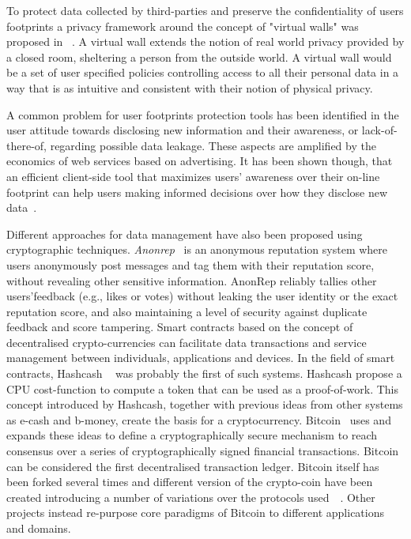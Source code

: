 To protect data collected by third-parties and preserve the confidentiality of users footprints a privacy framework around the concept of "virtual walls" was proposed in ~\cite{kapadia2007virtual}. A virtual wall extends the notion of real world privacy provided by a closed room, sheltering a person from the outside world. A virtual wall would be a set of user specified policies controlling access to all their personal data
in a way that is as intuitive and consistent with their notion of physical privacy.

A common problem for user footprints protection tools has been identified in the user attitude towards disclosing new information and their awareness, or lack-of-there-of, regarding possible data leakage. These aspects are amplified by the economics of web services based on advertising. It has been shown though, that an efficient client-side tool that maximizes users’ awareness over their on-line footprint can help users making informed decisions
over how they disclose new data~\cite{malandrino2013privacy}.

Different approaches for data management have also been proposed using cryptographic techniques. \emph{Anonrep}~\cite{zhai2016anonrep} is an anonymous reputation system where users anonymously post messages and tag them with their reputation score, without revealing other sensitive information. AnonRep reliably tallies other users’feedback (e.g., likes or votes) without leaking the user identity or the exact reputation score, and also maintaining a level of security against duplicate feedback and score tampering. Smart contracts based on the concept of decentralised crypto-currencies can facilitate data transactions and service management between individuals, applications and devices. In the field of smart contracts, Hashcash ~\cite{back2002hashcash, back2002hashcash2} was probably the first of such systems. Hashcash propose a CPU cost-function to compute a token that can be used as a proof-of-work. This concept introduced by Hashcash, together with previous ideas from other systems as e-cash and b-money, create the basis for a cryptocurrency. Bitcoin~\cite{nakamoto2008bitcoin} uses and expands these ideas to define a cryptographically secure mechanism to reach consensus over a series of cryptographically signed financial transactions. Bitcoin can be considered the first decentralised transaction ledger. Bitcoin itself has been forked several times and different version of the crypto-coin have been created introducing a number of variations over the protocols used~\cite{tschorsch2015bitcoin}~\cite{sprankel2013technical}. Other projects instead re-purpose core paradigms of Bitcoin to different applications and domains.

